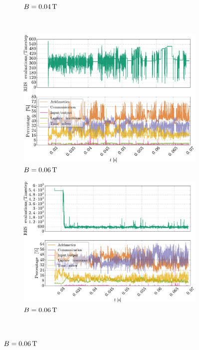 \begin{figure}[htbp]
\begin{subfigure}[h]{0.45\textwidth}
        \caption{$B=0.04\, \text{T}$}
        \label{fig:perf004}
    \end{subfigure}%
    \\
    \begin{subfigure}[h]{0.45\textwidth}
        \centering
        \includegraphics[width=1.0\textwidth]{fig/results/compareBouss/performance006B}
        \caption{$B=0.06\, \text{T}$}
        \label{fig:perf006B}
    \end{subfigure}
    \hfill
    \begin{subfigure}[h]{0.45\textwidth}
        \centering
        \includegraphics[width=1.0\textwidth]{fig/results/performance/performance006}
        \caption{$B=0.06\, \text{T}$}
        \label{fig:perf006}
    \end{subfigure}
    \\

\end{figure}

